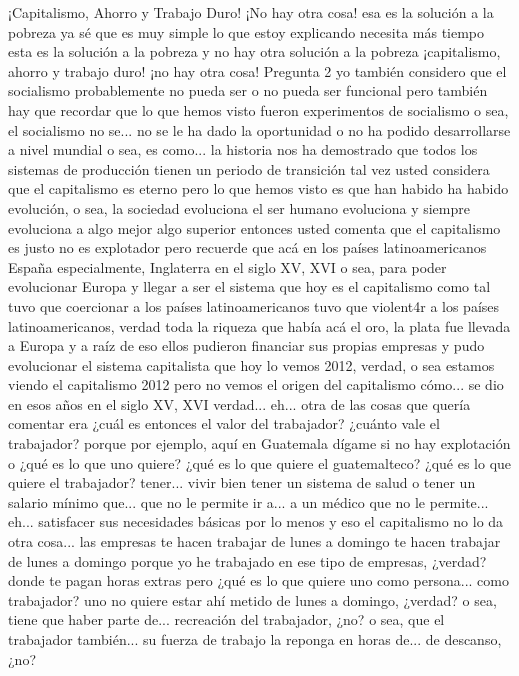 ¡Capitalismo, Ahorro y Trabajo Duro! ¡No hay otra cosa!
esa es la solución a la pobreza ya sé que es muy simple lo que estoy explicando necesita más tiempo
esta es la solución a la pobreza y no hay otra solución a la pobreza ¡capitalismo, ahorro y trabajo duro! ¡no hay otra cosa!
Pregunta 2
yo también considero que el socialismo probablemente no pueda ser o no pueda ser funcional
pero también hay que recordar que lo que hemos visto fueron experimentos de socialismo o sea, el socialismo no se...
no se le ha dado la oportunidad o no ha podido desarrollarse a nivel mundial o sea, es como...
la historia nos ha demostrado que todos los sistemas de producción tienen un periodo de transición
tal vez usted considera que el capitalismo es eterno pero lo que hemos visto es que han habido
ha habido evolución, o sea, la sociedad evoluciona el ser humano evoluciona y siempre evoluciona a algo mejor
algo superior entonces usted comenta que el capitalismo es justo no es explotador
pero recuerde que acá en los países latinoamericanos España especialmente, Inglaterra
en el siglo XV, XVI o sea, para poder evolucionar Europa y llegar a ser
el sistema que hoy es el capitalismo como tal tuvo que coercionar a los países latinoamericanos
tuvo que violent4r a los países latinoamericanos, verdad toda la riqueza que había acá
el oro, la plata fue llevada a Europa y a raíz de eso ellos pudieron financiar sus propias empresas
y pudo evolucionar el sistema capitalista que hoy lo vemos 2012, verdad, o sea
estamos viendo el capitalismo 2012 pero no vemos el origen del capitalismo cómo...
se dio en esos años en el siglo XV, XVI verdad... eh... otra de las cosas que quería comentar era
¿cuál es entonces el valor del trabajador? ¿cuánto vale el trabajador? porque por ejemplo, aquí en Guatemala
dígame si no hay explotación o ¿qué es lo que uno quiere? ¿qué es lo que quiere el guatemalteco? ¿qué es lo que quiere el trabajador?
tener... vivir bien tener un sistema de salud
o tener un salario mínimo que... que no le permite ir a... a un médico
que no le permite... eh... satisfacer sus necesidades básicas por lo menos
y eso el capitalismo no lo da otra cosa... las empresas
te hacen trabajar de lunes a domingo te hacen trabajar de lunes a domingo
porque yo he trabajado en ese tipo de empresas, ¿verdad? donde te pagan horas extras
pero ¿qué es lo que quiere uno como persona... como trabajador? uno no quiere estar ahí metido de lunes a domingo, ¿verdad?
o sea, tiene que haber parte de... recreación del trabajador, ¿no? o sea, que el trabajador también...
su fuerza de trabajo la reponga en horas de... de descanso, ¿no?
